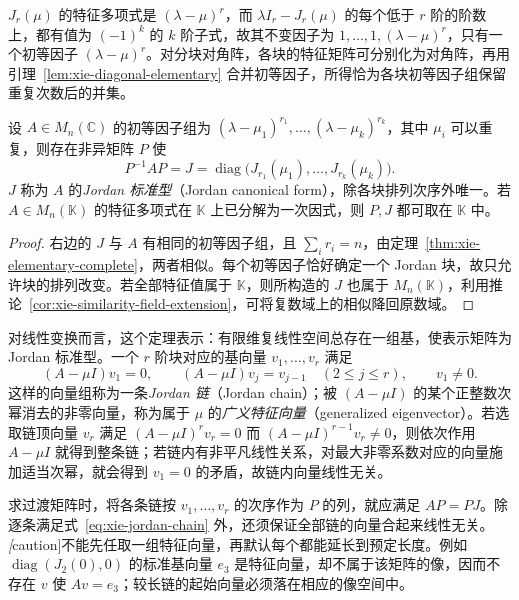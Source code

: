 $J_r(\mu)$ 的特征多项式是 $(\lambda-\mu)^r$，而 $\lambda I_r-J_r(\mu)$ 的每个低于 $r$ 阶的阶数上，都有值为 $(-1)^k$ 的 $k$ 阶子式，故其不变因子为 $1,\ldots,1,(\lambda-\mu)^r$，只有一个初等因子 $(\lambda-\mu)^r$。对分块对角阵，各块的特征矩阵可分别化为对角阵，再用引理~\ref{lem:xie-diagonal-elementary} 合并初等因子，所得恰为各块初等因子组保留重复次数后的并集。

\begin{theorem}
\label{thm:xie-jordan-canonical}
设 $A\in M_n(\mathbb C)$ 的初等因子组为 $(\lambda-\mu_1)^{r_1},\ldots,(\lambda-\mu_k)^{r_k}$，其中 $\mu_i$ 可以重复，则存在非异矩阵 $P$ 使
\begin{equation}
\label{eq:xie-jordan-canonical}
    P^{-1}AP=J=\operatorname{diag}\bigl(J_{r_1}(\mu_1),\ldots,J_{r_k}(\mu_k)\bigr).
\end{equation}
$J$ 称为 $A$ 的\emph{Jordan 标准型}（Jordan canonical form），除各块排列次序外唯一。若 $A\in M_n(\mathbb K)$ 的特征多项式在 $\mathbb K$ 上已分解为一次因式，则 $P,J$ 都可取在 $\mathbb K$ 中。
\end{theorem}
\begin{proof}
右边的 $J$ 与 $A$ 有相同的初等因子组，且 $\sum_i r_i=n$，由定理~\ref{thm:xie-elementary-complete}，两者相似。每个初等因子恰好确定一个 Jordan 块，故只允许块的排列改变。若全部特征值属于 $\mathbb K$，则所构造的 $J$ 也属于 $M_n(\mathbb K)$，利用推论~\ref{cor:xie-similarity-field-extension}，可将复数域上的相似降回原数域。
\end{proof}

对线性变换而言，这个定理表示：有限维复线性空间总存在一组基，使表示矩阵为 Jordan 标准型。一个 $r$ 阶块对应的基向量 $v_1,\ldots,v_r$ 满足
\begin{equation}
\label{eq:xie-jordan-chain}
    (A-\mu I)v_1=0,\qquad
    (A-\mu I)v_j=v_{j-1}\quad(2\le j\le r),
    \qquad v_1\ne0.
\end{equation}
这样的向量组称为一条\emph{Jordan 链}（Jordan chain）；被 $(A-\mu I)$ 的某个正整数次幂消去的非零向量，称为属于 $\mu$ 的\emph{广义特征向量}（generalized eigenvector）。若选取链顶向量 $v_r$ 满足 $(A-\mu I)^rv_r=0$ 而 $(A-\mu I)^{r-1}v_r\ne0$，则依次作用 $A-\mu I$ 就得到整条链；若链内有非平凡线性关系，对最大非零系数对应的向量施加适当次幂，就会得到 $v_1=0$ 的矛盾，故链内向量线性无关。

求过渡矩阵时，将各条链按 $v_1,\ldots,v_r$ 的次序作为 $P$ 的列，就应满足 $AP=PJ$。除逐条满足式~\eqref{eq:xie-jordan-chain} 外，还须保证全部链的向量合起来线性无关。\emph[caution]{不能先任取一组特征向量，再默认每个都能延长到预定长度。}例如 $\operatorname{diag}(J_2(0),0)$ 的标准基向量 $e_3$ 是特征向量，却不属于该矩阵的像，因而不存在 $v$ 使 $Av=e_3$；较长链的起始向量必须落在相应的像空间中。

